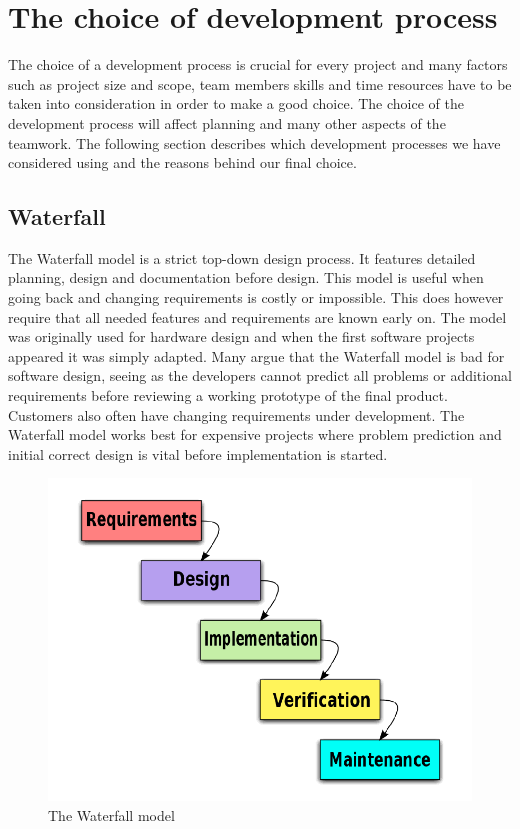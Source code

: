 \section{The choice of development process}
The choice of a development process is crucial for every project and many factors
such as project size and scope, team members skills and time resources have to be taken into
consideration in order to make a good choice. The choice of the development process will affect
planning and many other aspects of the teamwork. The following section describes
which development processes we have considered using and the reasons behind our final choice.

\subsection{Waterfall}
The Waterfall model is a strict top-down design process. It features detailed planning, design and
documentation before design. This model is useful when going back and changing requirements is
costly or impossible. This does however require that all needed features and requirements are known
early on. The model was originally used for hardware design and when the first software projects 
appeared it was simply adapted. Many argue that the Waterfall model is bad for software design, seeing
as the developers cannot predict all problems or additional requirements before reviewing a working
prototype of the final product. Customers also often have changing requirements under development.
The Waterfall model works best for expensive projects where problem prediction and initial correct design
is vital before implementation is started.
\begin{figure}[h!]
\centering \includegraphics[scale=0.30]{img/designmodel-waterwall} \caption{The Waterfall model}
\label{fig:desigmodel-waterfall}
\end{figure}

